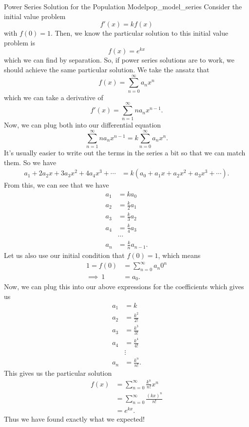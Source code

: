 \begin{ex}{Power Series Solution for the Population Model}{pop_model_series}
Consider the initial value problem
\[
f'(x)=kf(x)
\]
with $f(0)=1$.  Then, we know the particular solution to this initial value problem is
\[
f(x)=e^{kx}
\]
which we can find by separation.  So, if power series solutions are to work, we should achieve the same particular solution. We take the ansatz that
\[
f(x) = \sum_{n=0}^\infty a_n x^n
\]
which we can take a derivative of
\[
f'(x) = \sum_{n=1}^\infty na_n x^{n-1}.
\]
Now, we can plug both into our differential equation
\[
\sum_{n=1}^\infty na_n x^{n-1} = k \sum_{n=0}^\infty a_n x^n.
\]
It's usually easier to write out the terms in the series a bit so that we can match them.  So we have
\begin{align*}
    a_1 + 2a_2 x + 3 a_3 x^2 + 4 a_4 x^3 + \cdots &= k(a_0 + a_1 x + a_2 x^2 + a_3 x^3+ \cdots ).
\end{align*}
From this, we can see that we have
\begin{align*}
    a_1 &= k a_0\\
    a_2 &= \frac{k}{2} a_1\\
    a_3 &= \frac{k}{3} a_2 \\
    a_4 &= \frac{k}{4} a_3 \\
    &\cdots \\
    a_n &= \frac{k}{n} a_{n-1}.
\end{align*}
Let us also use our initial condition that $f(0)=1$, which means
\begin{align*}
    1=f(0)&=\sum_{n=0}^\infty a_n 0^n\\
    \implies~1&= a_0.
\end{align*}
Now, we can plug this into our above expressions for the coefficients which gives us
\begin{align*}
    a_1 &= k \\
    a_2 &= \frac{k^2}{2!} \\
    a_3 &= \frac{k^3}{3!}  \\
    a_4 &= \frac{k^4}{4!} \\
    &\vdots \\
    a_n &= \frac{k^n}{n!}.
\end{align*}
This gives us the particular solution
\begin{align*}
f(x) &= \sum_{n=0}^\infty \frac{k^n}{n!} x^n\\
&= \sum_{n=0}^\infty \frac{(kx)^n}{n!}\\
&= e^{kx}.
\end{align*}
Thus we have found exactly what we expected!
\end{ex}

